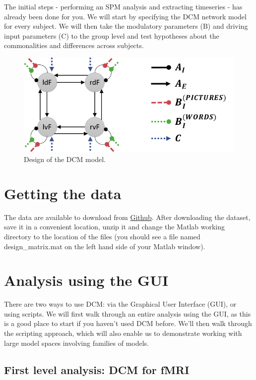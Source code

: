 \documentclass{article}
\begin{document}
The initial steps - performing an SPM analysis and extracting timeseries - has already been done for you. We will start by specifying the DCM network model for every subject. We will then take the modulatory parameters (B) and driving input parameters (C) to the group level and test hypotheses about the commonalities and differences across subjects.

\begin{figure}[ht]
\begin{center}
\includegraphics{"Fig_intro_network"}
\caption{Design of the DCM model.\label{Fig_intro_network}}
\end{center}
\end{figure}

\section{Getting the data}
The data are available to download from \href{https://github.com/pzeidman/dcm-peb-example/archive/master.zip}{Github}. After downloading the dataset, save it in a convenient location, unzip it and change the Matlab working directory to the location of the files (you should see a file named design\_matrix.mat on the left hand side of your Matlab window).

\section{Analysis using the GUI}
There are two ways to use DCM: via the Graphical User Interface (GUI), or using scripts. We will first walk through an entire analysis using the GUI, as this is a good place to start if you haven't used DCM before. We'll then walk through the scripting approach, which will also enable us to demonstrate working with large model spaces involving families of models.

\subsection{First level analysis: DCM for fMRI}
\end{document}
